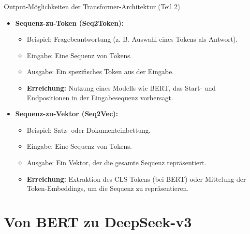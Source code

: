 \documentclass[aspectratio=1610, xcolor=dvipsnames, 9pt]{beamer}
\begin{document}
\begin{frame}{Output-Möglichkeiten der Transformer-Architektur (Teil 2)}
  \begin{itemize}
    \item \textbf{Sequenz-zu-Token (Seq2Token):}
      \begin{itemize}
        \item Beispiel: Fragebeantwortung (z. B. Auswahl eines Tokens als Antwort).
        \item Eingabe: Eine Sequenz von Tokens.
        \item Ausgabe: Ein spezifisches Token aus der Eingabe.
        \item \textbf{Erreichung:} Nutzung eines Modells wie BERT, das Start- und Endpositionen in der Eingabesequenz vorhersagt.
      \end{itemize}
    \item \textbf{Sequenz-zu-Vektor (Seq2Vec):}
      \begin{itemize}
        \item Beispiel: Satz- oder Dokumenteinbettung.
        \item Eingabe: Eine Sequenz von Tokens.
        \item Ausgabe: Ein Vektor, der die gesamte Sequenz repräsentiert.
        \item \textbf{Erreichung:} Extraktion des CLS-Tokens (bei BERT) oder Mittelung der Token-Embeddings, um die Sequenz zu repräsentieren.
      \end{itemize}
  \end{itemize}
\end{frame}

\section{Von BERT zu DeepSeek-v3}
\end{document}
